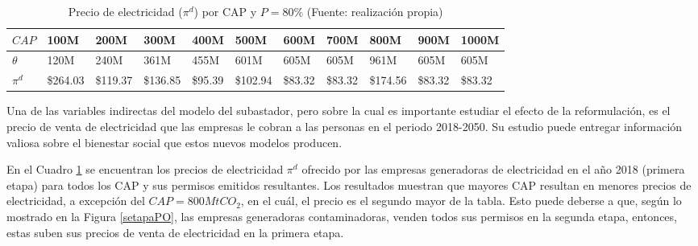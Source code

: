 \begin{table}[H]
\begin{footnotesize}
    \centering
    \begin{tabular}{|l|l|l|l|l|l|l|l|l|l|l|}
    \hline
        $CAP$ & 100M & 200M & 300M & 400M & 500M & 600M & 700M & 800M & 900M & 1000M \\ \hline
        $\theta$  & 120M & 240M & 361M & 455M & 601M & 605M & 605M & 961M & 605M & 605M \\ \hline
        $\pi^d$  &  \$264.03   &  \$119.37   &  \$136.85   &  \$95.39   &  \$102.94   &  \$83.32   &  \$83.32   &  \$174.56   &  \$83.32   &  \$83.32   \\ \hline
    \end{tabular}
    \caption{{\footnotesize Precio de electricidad ($\pi^d$) por CAP y $P=80\%$ (Fuente: realización propia)}}
    \label{POpidporcap}
\end{footnotesize}
\end{table}

Una de las variables indirectas del modelo del subastador, pero sobre la cual es importante estudiar el efecto de la reformulación, es el precio de venta de electricidad que las empresas le cobran a las personas en el periodo 2018-2050. Su estudio puede entregar información valiosa sobre el bienestar social que estos nuevos modelos producen.
\vspace{2.5mm}

En el Cuadro \ref{POpidporcap} se encuentran los precios de electricidad $\pi^d$ ofrecido por las empresas generadoras de electricidad en el año 2018 (primera etapa) para todos los CAP y sus permisos emitidos resultantes. Los resultados muestran que mayores CAP resultan en menores precios de electricidad, a excepción del $CAP= 800MtCO_2$, en el cuál, el precio es el segundo mayor de la tabla. Esto puede deberse a que, según lo mostrado en la Figura \ref{setapaPO}, las empresas generadoras contaminadoras, venden todos sus permisos en la segunda etapa, entonces, estas suben sus precios de venta de electricidad en la primera etapa.
\vspace{2.5mm}

